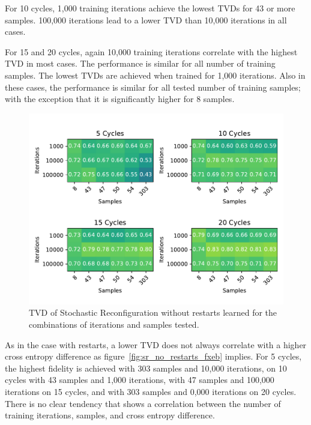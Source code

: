 For 10 cycles, 1,000 training iterations achieve the lowest TVDs for 43 or more samples. 
100,000 iterations lead to a lower TVD than 10,000 iterations in all cases. 

For 15 and 20 cycles, again 10,000 training iterations correlate with the highest TVD in most cases.
The performance is similar for all number of training samples. The lowest TVDs are achieved when trained for 1,000
iterations. Also in these cases, the performance is similar for all tested number of training samples; with 
the exception that it is significantly higher for 8 samples.

\begin{figure}[H]
  \centering
  \includegraphics[width=\textwidth]{figures/results/SR-no-restarts-learned/tvd_heatmap.pdf}
  \caption[TVD of Stochastic Reconfiguration without restarts learned]{TVD of Stochastic 
  Reconfiguration without restarts learned for the combinations of iterations and samples tested.}
  \label{fig:sr_no_restarts_tvd}
\end{figure}

As in the case with restarts, a lower TVD does not always correlate with a higher cross entropy difference as 
figure~\ref{fig:sr_no_restarts_fxeb}
implies. For 5 cycles, the highest fidelity is achieved with 303 samples and 10,000 iterations, on 10 cycles 
with 43 samples and 1,000 iterations, with 47 samples and 100,000 iterations on 15 cycles, and with 303 samples and 
0,000 iterations on 20 cycles. There is no clear tendency that shows a correlation between 
the number of training iterations, samples, and cross entropy difference.

